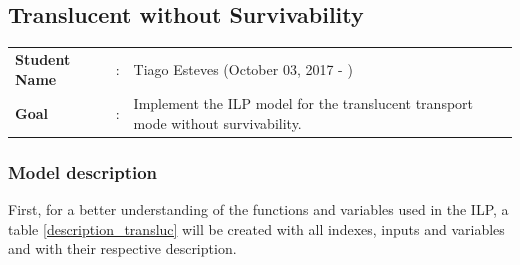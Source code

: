 \clearpage

\subsection{Translucent without Survivability}\label{ILP_Transluc_Survivability}
\begin{tcolorbox}	
\begin{tabular}{p{2.75cm} p{0.2cm} p{10.5cm}} 	
\textbf{Student Name}  &:& Tiago Esteves    (October 03, 2017 - )\\
\textbf{Goal}          &:& Implement the ILP model for the translucent transport mode without survivability.
\end{tabular}
\end{tcolorbox}

\subsubsection{Model description}

First, for a better understanding of the functions and variables used in the ILP, a table \ref{description_transluc} will be created with all indexes, inputs and variables and with their respective description.

